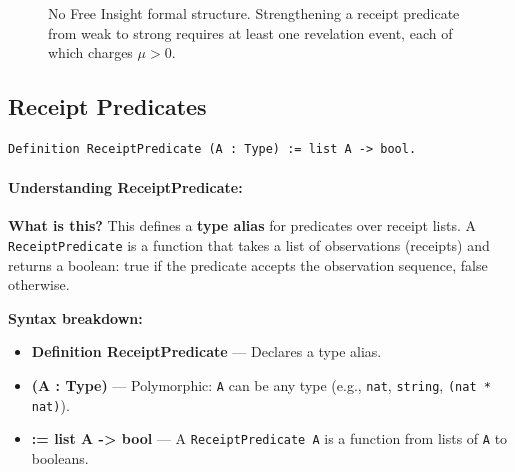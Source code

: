 \begin{figure}[H]
\centering
{}
\caption{No Free Insight formal structure. Strengthening a receipt predicate from weak to strong requires at least one revelation event, each of which charges $\mu > 0$.}
\label{fig:no-free-insight-formal}
\end{figure}

\subsection{Receipt Predicates}

\begin{lstlisting}
Definition ReceiptPredicate (A : Type) := list A -> bool.
\end{lstlisting}

\paragraph{Understanding ReceiptPredicate:}

\textbf{What is this?} This defines a \textbf{type alias} for predicates over receipt lists. A \texttt{ReceiptPredicate} is a function that takes a list of observations (receipts) and returns a boolean: true if the predicate accepts the observation sequence, false otherwise.

\textbf{Syntax breakdown:}
\begin{itemize}
    \item \textbf{Definition ReceiptPredicate} — Declares a type alias.
    \item \textbf{(A : Type)} — Polymorphic: \texttt{A} can be any type (e.g., \texttt{nat}, \texttt{string}, \texttt{(nat * nat)}).
    \item \textbf{:= list A -> bool} — A \texttt{ReceiptPredicate A} is a function from lists of \texttt{A} to booleans.
\end{itemize}

